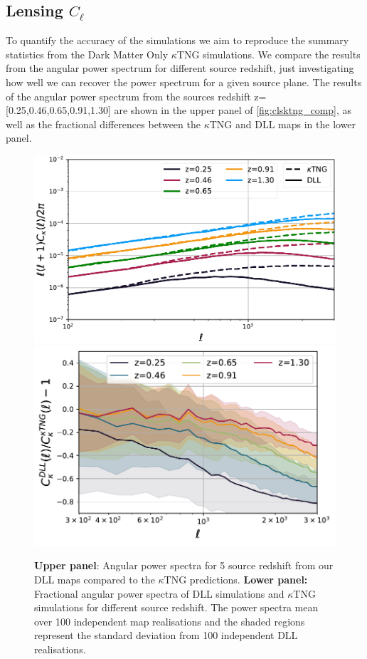 \documentclass[twocolumn,twocolappendix]{aastex63}
\begin{document}
\subsection{Lensing $C_\ell$}
To quantify the accuracy of the simulations we aim to reproduce the summary statistics from the Dark Matter Only $\kappa$TNG simulations. 
We compare the results from the angular power spectrum for different source redshift, just investigating how well we can recover the power spectrum for a given source plane. The results of the angular power spectrum from the sources redshift z=[0.25,0.46,0.65,0.91,1.30] are shown in the upper panel of \autoref{fig:clsktng_comp}, as well as the fractional differences between the $\kappa$TNG and DLL maps in the lower panel.
\begin{figure}
    \centering
    \includegraphics[width=\columnwidth]{paper/figures/cls_DLL_vs_ktng.pdf}
    \includegraphics[width=\columnwidth]{paper/figures/res_cls_DLL_vs_ktng.pdf}
    \caption{
    \textbf{Upper panel}: Angular power spectra for 5 source redshift from
our DLL maps compared to the $\kappa$TNG predictions.
 \textbf{Lower panel:} Fractional angular power spectra of DLL simulations and $\kappa$TNG simulations for different source redshift.
  The power spectra mean over 100 independent map realisations and the shaded regions represent the standard deviation from 100 independent DLL realisations.}
     \label{fig:clsktng_comp}
\end{figure}
\end{document}
